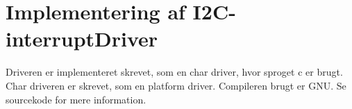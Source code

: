 \documentclass[Softwaredesign/Softwaredesign_main.tex]{subfiles}
\begin{document}
\section{Implementering af I2C-interruptDriver}
Driveren er implementeret skrevet, som en char driver, hvor sproget c er brugt. Char driveren er skrevet, som en platform driver. Compileren brugt er GNU. Se sourcekode for mere information.
\end{document}
